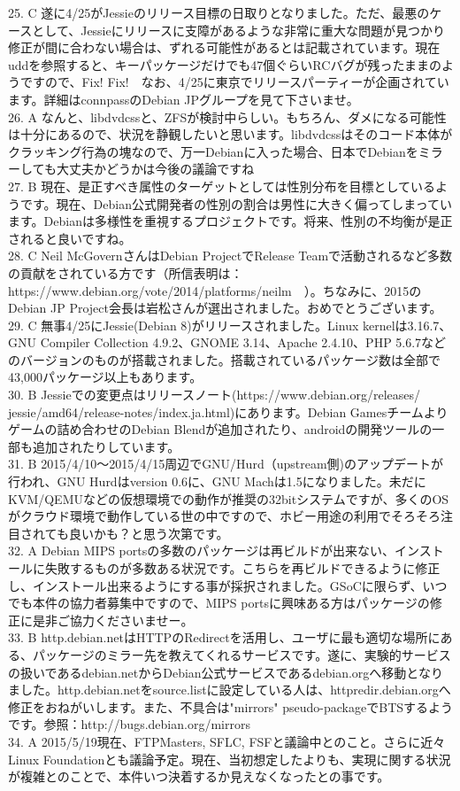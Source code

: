 \documentclass[mingoth,a4paper]{jsarticle}
\begin{document}
{25. C 遂に4/25がJessieのリリース目標の日取りとなりました。ただ、最悪のケースとして、Jessieにリリースに支障があるような非常に重大な問題が見つかり修正が間に合わない場合は、ずれる可能性があるとは記載されています。現在uddを参照すると、キーパッケージだけでも47個ぐらいRCバグが残ったままのようですので、Fix! Fix!　なお、4/25に東京でリリースパーティーが企画されています。詳細はconnpassのDebian JPグループを見て下さいませ。\\
26. A なんと、libdvdcssと、ZFSが検討中らしい。もちろん、ダメになる可能性は十分にあるので、状況を静観したいと思います。libdvdcssはそのコード本体がクラッキング行為の塊なので、万一Debianに入った場合、日本でDebianをミラーしても大丈夫かどうかは今後の議論ですね\\
27. B 現在、是正すべき属性のターゲットとしては性別分布を目標としているようです。現在、Debian公式開発者の性別の割合は男性に大きく偏ってしまっています。Debianは多様性を重視するプロジェクトです。将来、性別の不均衡が是正されると良いですね。\\
28. C Neil McGovernさんはDebian ProjectでRelease Teamで活動されるなど多数の貢献をされている方です（所信表明は：https://www.debian.org/vote/2014/platforms/neilm　）。ちなみに、2015のDebian JP Project会長は岩松さんが選出されました。おめでとうございます。\\
29. C 無事4/25にJessie(Debian 8)がリリースされました。Linux kernelは3.16.7、GNU Compiler Collection 4.9.2、GNOME 3.14、Apache 2.4.10、PHP 5.6.7などのバージョンのものが搭載されました。搭載されているパッケージ数は全部で43,000パッケージ以上もあります。\\
30. B Jessieでの変更点はリリースノート(https://www.debian.org/releases/ jessie/amd64/release-notes/index.ja.html)にあります。Debian Gamesチームよりゲームの詰め合わせのDebian Blendが追加されたり、androidの開発ツールの一部も追加されたりしています。\\
31. B 2015/4/10〜2015/4/15周辺でGNU/Hurd（upstream側)のアップデートが行われ、GNU Hurdはversion 0.6に、GNU Machは1.5になりました。未だにKVM/QEMUなどの仮想環境での動作が推奨の32bitシステムですが、多くのOSがクラウド環境で動作している世の中ですので、ホビー用途の利用でそろそろ注目されても良いかも？と思う次第です。\\
32. A Debian MIPS portsの多数のパッケージは再ビルドが出来ない、インストールに失敗するものが多数ある状況です。こちらを再ビルドできるように修正し、インストール出来るようにする事が採択されました。GSoCに限らず、いつでも本件の協力者募集中ですので、MIPS portsに興味ある方はパッケージの修正に是非ご協力くださいませー。\\
33. B http.debian.netはHTTPのRedirectを活用し、ユーザに最も適切な場所にある、パッケージのミラー先を教えてくれるサービスです。遂に、実験的サービスの扱いであるdebian.netからDebian公式サービスであるdebian.orgへ移動となりました。http.debian.netをsource.listに設定している人は、httpredir.debian.orgへ修正をおねがいします。また、不具合は"mirrors" pseudo-packageでBTSするようです。参照：http://bugs.debian.org/mirrors　\\
34. A 2015/5/19現在、FTPMasters, SFLC, FSFと議論中とのこと。さらに近々Linux Foundationとも議論予定。現在、当初想定したよりも、実現に関する状況が複雑とのことで、本件いつ決着するか見えなくなったとの事です。\\

}
\end{document}
